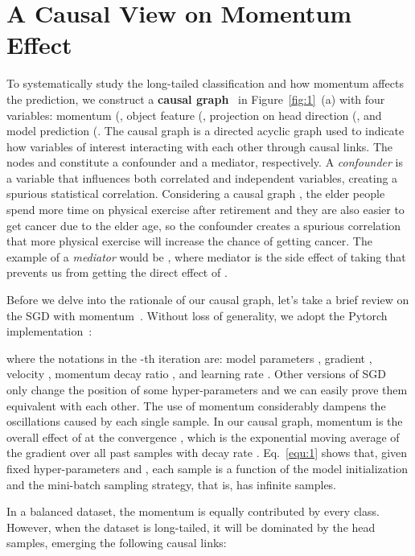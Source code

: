 \documentclass{article}
\begin{document}
\section{A Causal View on Momentum Effect}
\label{sec:causal_graph}
To systematically study the long-tailed classification and how momentum affects the prediction, we construct a \textbf{causal graph}~\cite{pearl2016causal,pearl2001direct} in Figure~\ref{fig:1}~(a) with four variables: momentum (, object feature (, projection on head direction (, and model prediction (. The causal graph is a directed acyclic graph used to indicate how variables of interest  interacting with each other through causal links. The nodes  and  constitute a confounder and a mediator, respectively. A \emph{confounder} is a variable that influences both correlated and independent variables, creating a spurious statistical correlation. Considering a causal graph , the elder people spend more time on physical exercise after retirement and they are also easier to get cancer due to the elder age, so the confounder  creates a spurious correlation that more physical exercise will increase the chance of getting cancer. The example of a \emph{mediator} would be , where mediator  is the side effect of taking   that prevents us from getting the direct effect of .

Before we delve into the rationale of our causal graph, let's take a brief review on the SGD with momentum~\cite{qian1999momentum}. Without loss of generality, we adopt the Pytorch implementation~\cite{pytorchSGD}: 

where the notations in the -th iteration are: model parameters , gradient , velocity , momentum decay ratio , and learning rate . Other versions of SGD~\cite{sutskever2013importance, qian1999momentum} only change the position of some hyper-parameters and we can easily prove them equivalent with each other. The use of momentum considerably dampens the oscillations caused by each single sample. In our causal graph, momentum  is the overall effect of  at the convergence , which is the exponential moving average of the gradient over all past samples with decay rate . Eq.~\eqref{equ:1} shows that, given fixed hyper-parameters  and , each sample  is a function of the model initialization and the mini-batch sampling strategy, that is,  has infinite samples. 

In a balanced dataset, the momentum is equally contributed by every class. However, when the dataset is long-tailed, it will be dominated by the head samples, emerging the following causal links:
\end{document}
